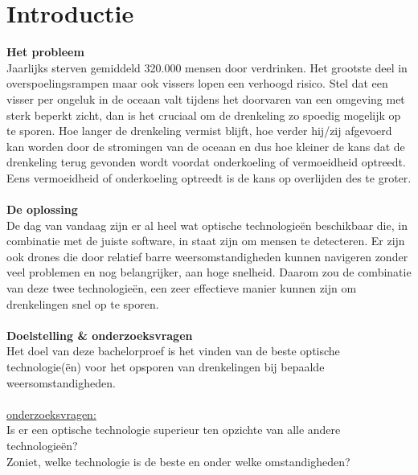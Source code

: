 
\section{Introductie} %
\label{sec:introductie}

\textbf{Het probleem}\\
Jaarlijks sterven gemiddeld 320.000 mensen door verdrinken. Het grootste deel in overspoelingsrampen maar ook vissers lopen een verhoogd risico. Stel dat een visser per ongeluk in de oceaan valt tijdens het doorvaren van een omgeving met sterk beperkt zicht, dan is het cruciaal om de drenkeling zo spoedig mogelijk op te sporen. Hoe langer de drenkeling vermist blijft, hoe verder hij/zij afgevoerd kan worden door de stromingen van de oceaan en dus hoe kleiner de kans dat de drenkeling terug gevonden wordt voordat onderkoeling of vermoeidheid optreedt. Eens vermoeidheid of onderkoeling optreedt is de kans op overlijden des te groter.\\\\
\textbf{De oplossing}\\
De dag van vandaag zijn er al heel wat optische technologieën beschikbaar die, in combinatie met de juiste software, in staat zijn om mensen te detecteren. Er zijn ook drones die door relatief barre weersomstandigheden kunnen navigeren zonder veel problemen en nog belangrijker, aan hoge snelheid. Daarom zou de combinatie van deze twee technologieën, een zeer effectieve manier kunnen zijn om drenkelingen snel op te sporen.\\\\

\newpage
\textbf{Doelstelling \& onderzoeksvragen}\\
Het doel van deze bachelorproef is het vinden van de beste optische technologie(ën) voor het opsporen van drenkelingen bij bepaalde weersomstandigheden.\\\\
\underline{onderzoeksvragen:}\\
Is er een optische technologie superieur ten opzichte van alle andere technologieën?\\ Zoniet, welke technologie is de beste en onder welke omstandigheden?

